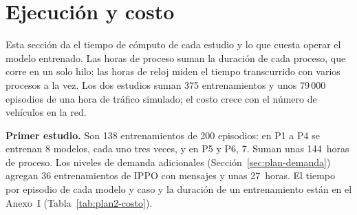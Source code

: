 \begin{algorithm}[H]
\small
\caption[Veredicto de un modelo en un caso]{Veredicto de un modelo en un caso, con dos tandas}
\label{alg:veredicto}
\end{algorithm}


\section{Ejecución y costo}
\label{sec:ejecucion}

Esta sección da el tiempo de cómputo de cada estudio y lo que cuesta
operar el modelo entrenado. Las horas de proceso suman la duración de
cada proceso, que corre en un solo hilo; las horas de reloj miden el
tiempo transcurrido con varios procesos a la vez. Los dos estudios
suman 375 entrenamientos y unos 79\,000 episodios de una hora de
tráfico simulado; el costo crece con el número de vehículos en la red.

\noindent\textbf{Primer estudio.} Son 138 entrenamientos de 200
episodios: en P1 a P4 se entrenan 8 modelos, cada uno tres veces, y en
P5 y P6, 7. Suman unas 144~horas de proceso. Los niveles de demanda
adicionales (Sección~\ref{sec:plan-demanda}) agregan 36 entrenamientos
de IPPO con mensajes y unas 27~horas. El tiempo por episodio de cada
modelo y caso y la duración de un entrenamiento están en el Anexo~I
(Tabla~\ref{tab:plan2-costo}).

